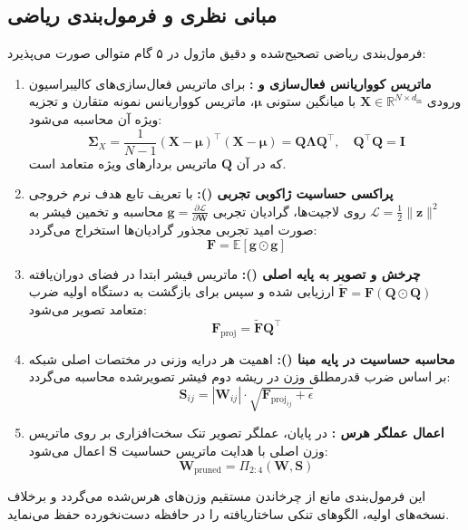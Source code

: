 \subsection{مبانی نظری و فرمول‌بندی ریاضی}
فرمول‌بندی ریاضی تصحیح‌شده و دقیق ماژول  در ۵ گام متوالی صورت می‌پذیرد:
\begin{enumerate}
    \item \textbf{ماتریس کوواریانس فعال‌سازی و :} برای ماتریس فعال‌سازی‌های کالیبراسیون ورودی $\mathbf{X} \in \mathbb{R}^{N \times d_{\text{in}}}$ با میانگین ستونی $\boldsymbol{\mu}$، ماتریس کوواریانس نمونه متقارن و تجزیه ویژه آن محاسبه می‌شود:
    \begin{equation}
    \boldsymbol{\Sigma}_X = \frac{1}{N-1} (\mathbf{X} - \boldsymbol{\mu})^\top (\mathbf{X} - \boldsymbol{\mu}) = \mathbf{Q} \boldsymbol{\Lambda} \mathbf{Q}^\top, \quad \mathbf{Q}^\top \mathbf{Q} = \mathbf{I}
    \end{equation}
    که در آن $\mathbf{Q}$ ماتریس بردارهای ویژه متعامد است.
    \item \textbf{پراکسی حساسیت ژاکوبی تجربی ():} با تعریف تابع هدف نرم خروجی $\mathcal{L} = \frac{1}{2} \|\mathbf{z}\|^2$ روی لاجیت‌ها، گرادیان تجربی $\mathbf{g} = \frac{\partial \mathcal{L}}{\partial \mathbf{W}}$ محاسبه و تخمین فیشر به صورت امید تجربی مجذور گرادیان‌ها استخراج می‌گردد:
    \begin{equation}
    \mathbf{F} = \mathbb{E}[\mathbf{g} \odot \mathbf{g}]
    \end{equation}
    \item \textbf{چرخش و تصویر به پایه اصلی ():} ماتریس فیشر ابتدا در فضای دوران‌یافته $\tilde{\mathbf{F}} = \mathbf{F} (\mathbf{Q} \odot \mathbf{Q})$ ارزیابی شده و سپس برای بازگشت به دستگاه اولیه ضرب متعامد تصویر می‌شود:
    \begin{equation}
    \mathbf{F}_{\text{proj}} = \tilde{\mathbf{F}} \mathbf{Q}^\top
    \end{equation}
    \item \textbf{محاسبه حساسیت در پایه مبنا ():} اهمیت هر درایه وزنی در مختصات اصلی شبکه بر اساس ضرب قدرمطلق وزن در ریشه دوم فیشر تصویرشده محاسبه می‌گردد:
    \begin{equation}
    \mathbf{S}_{ij} = |\mathbf{W}_{ij}| \cdot \sqrt{\mathbf{F}_{{\text{proj}}_{ij}} + \epsilon}
    \end{equation}
    \item \textbf{اعمال عملگر هرس :} در پایان، عملگر تصویر تنک سخت‌افزاری بر روی ماتریس وزن اصلی با هدایت ماتریس حساسیت $\mathbf{S}$ اعمال می‌شود:
    \begin{equation}
    \mathbf{W}_{\text{pruned}} = \Pi_{2:4}(\mathbf{W}, \mathbf{S})
    \end{equation}
\end{enumerate}
این فرمول‌بندی مانع از چرخاندن مستقیم وزن‌های هرس‌شده می‌گردد و برخلاف نسخه‌های اولیه، الگوهای تنکی ساختاریافته  را در حافظه دست‌نخورده حفظ می‌نماید.

